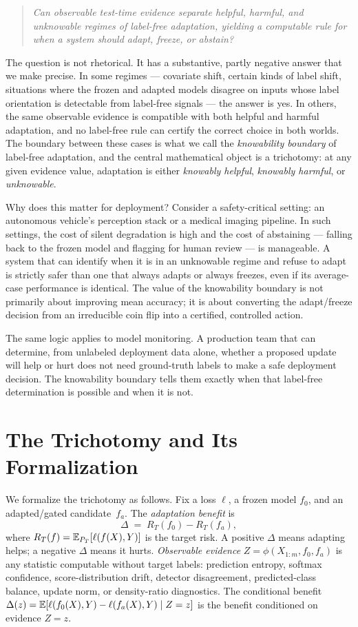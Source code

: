 \begin{quote}
\itshape
Can observable test-time evidence separate helpful, harmful, and
unknowable regimes of label-free adaptation, yielding a computable rule
for when a system should adapt, freeze, or abstain?
\end{quote}

The question is not rhetorical.
It has a substantive, partly negative answer that we make precise.
In some regimes --- covariate shift, certain kinds of label shift, situations
where the frozen and adapted models disagree on inputs whose label
orientation is detectable from label-free signals --- the answer is yes.
In others, the same observable evidence is compatible with both helpful and
harmful adaptation, and no label-free rule can certify the correct choice
in both worlds.
The boundary between these cases is what we call the \emph{knowability
boundary} of label-free adaptation, and the central mathematical object is
a trichotomy: at any given evidence value, adaptation is either
\emph{knowably helpful}, \emph{knowably harmful}, or \emph{unknowable}.

Why does this matter for deployment?
Consider a safety-critical setting: an autonomous vehicle's perception stack
or a medical imaging pipeline.
In such settings, the cost of silent degradation is high and the cost of
abstaining --- falling back to the frozen model and flagging for human review
--- is manageable.
A system that can identify when it is in an unknowable regime and refuse to
adapt is strictly safer than one that always adapts or always freezes,
even if its average-case performance is identical.
The value of the knowability boundary is not primarily about improving mean
accuracy; it is about converting the adapt/freeze decision from an
irreducible coin flip into a certified, controlled action.

The same logic applies to model monitoring.
A production team that can determine, from unlabeled deployment data alone,
whether a proposed update will help or hurt does not need ground-truth labels
to make a safe deployment decision.
The knowability boundary tells them exactly when that label-free determination
is possible and when it is not.

\section{The Trichotomy and Its Formalization}\label{sec:intro-trichotomy}

We formalize the trichotomy as follows.
Fix a loss $\ell$, a frozen model $f_0$, and an adapted/gated
candidate~$f_a$.
The \emph{adaptation benefit} is
\[
\Delta \;=\; R_T(f_0) - R_T(f_a),
\]
where $R_T(f) = \mathbb{E}_{P_T}[\ell(f(X), Y)]$ is the target risk.
A positive $\Delta$ means adapting helps; a negative $\Delta$ means it
hurts.
\emph{Observable evidence} $Z = \phi(X_{1:m}, f_0, f_a)$ is any statistic
computable without target labels: prediction entropy, softmax confidence,
score-distribution drift, detector disagreement, predicted-class balance,
update norm, or density-ratio diagnostics.
The conditional benefit $\Delta(z) = \mathbb{E}[\ell(f_0(X),Y) - \ell(f_a(X),Y)
\mid Z = z]$ is the benefit conditioned on evidence $Z = z$.

